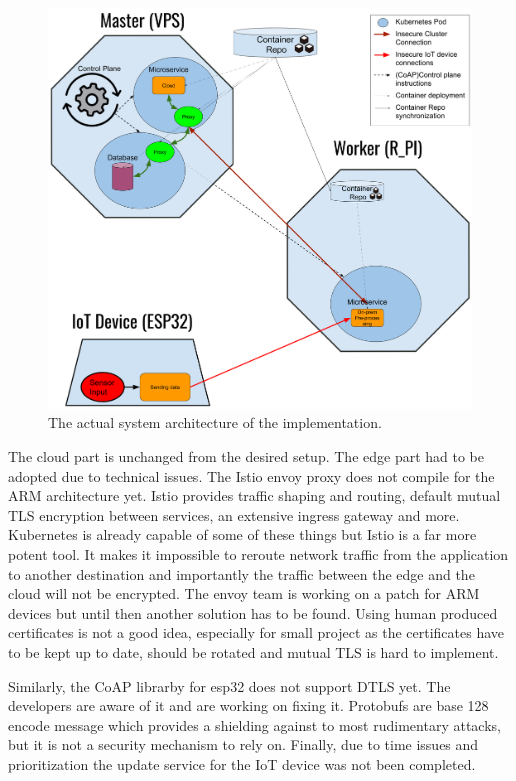 \begin{figure}[h]
    \centering
    \includegraphics[width=\textwidth]{figures/actualImplementationSetup.png}
    \caption{The actual system architecture of the implementation.}
    \label{fig:actualImplementationSetup}
\end{figure}

The cloud part is unchanged from the desired setup. The edge part had to be adopted due to technical issues. The Istio envoy proxy does not compile for the ARM architecture yet. Istio provides traffic shaping and routing, default mutual TLS encryption between services, an extensive ingress gateway and more. Kubernetes is already capable of some of these things but Istio is a far more potent tool. It makes it impossible to reroute network traffic from the application to another destination and importantly the traffic between the edge and the cloud will not be encrypted. The envoy team is working on a patch for ARM devices but until then another solution has to be found. Using human produced certificates is not a good idea, especially for small project as the certificates have to be kept up to date, should be rotated and mutual TLS is hard to implement.

Similarly, the CoAP librarby for esp32 does not support DTLS yet. The developers are aware of it and are working on fixing it. Protobufs are base 128 encode message which provides a shielding against to most rudimentary attacks, but it is not a security mechanism to rely on. Finally, due to time issues and prioritization the update service for the IoT device was not been completed.


